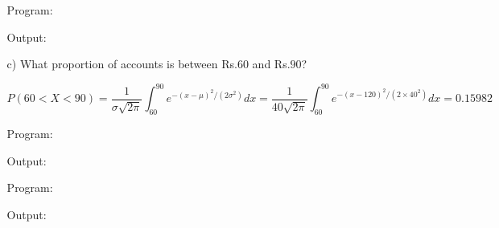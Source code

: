 \documentclass[a4paper,11pt,openright]{report}
\begin{document}
\begin{enumerate}
\begin{enumerate}
Program:

Output:


\pagebreak

\item[c)] What proportion of accounts is between Rs.$60$ and Rs.$90$?

\begin{equation*}
P(60 < X < 90) = \frac{1}{\sigma\sqrt{2\pi}} \int_{60}^{90} e^{-(x-\mu)^2/(2\sigma^{2})} dx 
		= \frac{1}{40\sqrt{2\pi}} \int_{60}^{90} e^{-(x-120)^2/(2 \times 40^{2})} dx 
		= 0.15982
\end{equation*}

Program:

Output:


Program:

Output:

\end{enumerate}

\end{enumerate}
\end{document}
